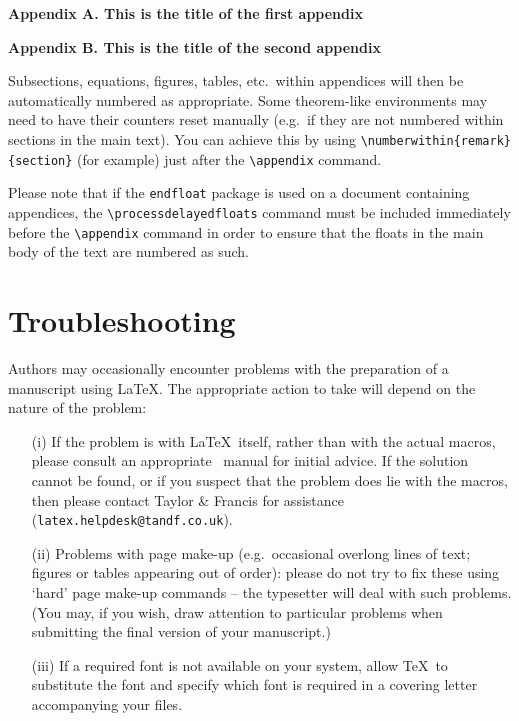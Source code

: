 \documentclass[]{interact}
\theoremstyle{plain}%
\theoremstyle{definition}
\theoremstyle{remark}
\begin{document}
\noindent\textbf{Appendix A. This is the title of the first appendix}\medskip

\noindent\textbf{Appendix B. This is the title of the second appendix}\medskip

\noindent Subsections, equations, figures, tables, etc.\ within appendices will then be automatically numbered as appropriate. Some theorem-like environments may need to have their counters reset manually (e.g.\ if they are not numbered within sections in the main text). You can achieve this by using \verb"\numberwithin{remark}{section}" (for example) just after the \verb"\appendix" command.

Please note that if the \verb"endfloat" package is used on a document containing appendices, the \verb"\processdelayedfloats" command must be included immediately before the \verb"\appendix" command in order to ensure that the floats in the main body of the text are numbered as such.


\appendix

\section{Troubleshooting}

Authors may occasionally encounter problems with the preparation of a manuscript using \LaTeX. The appropriate action to take will depend on the nature of the problem:
\begin{enumerate}
\item[(i)] If the problem is with \LaTeX\ itself, rather than with the actual macros, please consult an appropriate \LaTeXe\ manual for initial advice. If the solution cannot be found, or if you suspect that the problem does lie with the macros, then please contact Taylor \& Francis for assistance (\texttt{latex.helpdesk@tandf.co.uk}).
\item[(ii)] Problems with page make-up (e.g.\ occasional overlong lines of text; figures or tables appearing out of order): please do not try to fix these using `hard' page make-up commands -- the typesetter will deal with such problems. (You may, if you wish, draw attention to particular problems when submitting the final version of your manuscript.)
\item[(iii)] If a required font is not available on your system, allow \TeX\ to substitute the font and specify which font is required in a covering letter accompanying your files.
\end{enumerate}
\end{document}
